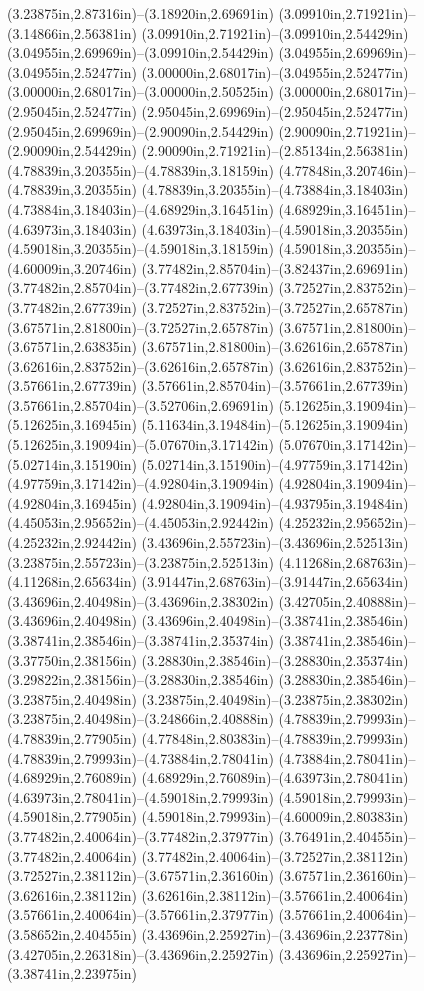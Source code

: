 (3.23875in,2.87316in)--(3.18920in,2.69691in) (3.09910in,2.71921in)--(3.14866in,2.56381in) (3.09910in,2.71921in)--(3.09910in,2.54429in) (3.04955in,2.69969in)--(3.09910in,2.54429in) (3.04955in,2.69969in)--(3.04955in,2.52477in) (3.00000in,2.68017in)--(3.04955in,2.52477in) (3.00000in,2.68017in)--(3.00000in,2.50525in) (3.00000in,2.68017in)--(2.95045in,2.52477in) (2.95045in,2.69969in)--(2.95045in,2.52477in) (2.95045in,2.69969in)--(2.90090in,2.54429in) (2.90090in,2.71921in)--(2.90090in,2.54429in) (2.90090in,2.71921in)--(2.85134in,2.56381in) (4.78839in,3.20355in)--(4.78839in,3.18159in) (4.77848in,3.20746in)--(4.78839in,3.20355in) (4.78839in,3.20355in)--(4.73884in,3.18403in) (4.73884in,3.18403in)--(4.68929in,3.16451in) (4.68929in,3.16451in)--(4.63973in,3.18403in) (4.63973in,3.18403in)--(4.59018in,3.20355in) (4.59018in,3.20355in)--(4.59018in,3.18159in) (4.59018in,3.20355in)--(4.60009in,3.20746in) (3.77482in,2.85704in)--(3.82437in,2.69691in) (3.77482in,2.85704in)--(3.77482in,2.67739in) (3.72527in,2.83752in)--(3.77482in,2.67739in) (3.72527in,2.83752in)--(3.72527in,2.65787in) (3.67571in,2.81800in)--(3.72527in,2.65787in) (3.67571in,2.81800in)--(3.67571in,2.63835in) (3.67571in,2.81800in)--(3.62616in,2.65787in) (3.62616in,2.83752in)--(3.62616in,2.65787in) (3.62616in,2.83752in)--(3.57661in,2.67739in) (3.57661in,2.85704in)--(3.57661in,2.67739in) (3.57661in,2.85704in)--(3.52706in,2.69691in) (5.12625in,3.19094in)--(5.12625in,3.16945in) (5.11634in,3.19484in)--(5.12625in,3.19094in) (5.12625in,3.19094in)--(5.07670in,3.17142in) (5.07670in,3.17142in)--(5.02714in,3.15190in) (5.02714in,3.15190in)--(4.97759in,3.17142in) (4.97759in,3.17142in)--(4.92804in,3.19094in) (4.92804in,3.19094in)--(4.92804in,3.16945in) (4.92804in,3.19094in)--(4.93795in,3.19484in) (4.45053in,2.95652in)--(4.45053in,2.92442in) (4.25232in,2.95652in)--(4.25232in,2.92442in) (3.43696in,2.55723in)--(3.43696in,2.52513in) (3.23875in,2.55723in)--(3.23875in,2.52513in) (4.11268in,2.68763in)--(4.11268in,2.65634in) (3.91447in,2.68763in)--(3.91447in,2.65634in) (3.43696in,2.40498in)--(3.43696in,2.38302in) (3.42705in,2.40888in)--(3.43696in,2.40498in) (3.43696in,2.40498in)--(3.38741in,2.38546in) (3.38741in,2.38546in)--(3.38741in,2.35374in) (3.38741in,2.38546in)--(3.37750in,2.38156in) (3.28830in,2.38546in)--(3.28830in,2.35374in) (3.29822in,2.38156in)--(3.28830in,2.38546in) (3.28830in,2.38546in)--(3.23875in,2.40498in) (3.23875in,2.40498in)--(3.23875in,2.38302in) (3.23875in,2.40498in)--(3.24866in,2.40888in) (4.78839in,2.79993in)--(4.78839in,2.77905in) (4.77848in,2.80383in)--(4.78839in,2.79993in) (4.78839in,2.79993in)--(4.73884in,2.78041in) (4.73884in,2.78041in)--(4.68929in,2.76089in) (4.68929in,2.76089in)--(4.63973in,2.78041in) (4.63973in,2.78041in)--(4.59018in,2.79993in) (4.59018in,2.79993in)--(4.59018in,2.77905in) (4.59018in,2.79993in)--(4.60009in,2.80383in) (3.77482in,2.40064in)--(3.77482in,2.37977in) (3.76491in,2.40455in)--(3.77482in,2.40064in) (3.77482in,2.40064in)--(3.72527in,2.38112in) (3.72527in,2.38112in)--(3.67571in,2.36160in) (3.67571in,2.36160in)--(3.62616in,2.38112in) (3.62616in,2.38112in)--(3.57661in,2.40064in) (3.57661in,2.40064in)--(3.57661in,2.37977in) (3.57661in,2.40064in)--(3.58652in,2.40455in) (3.43696in,2.25927in)--(3.43696in,2.23778in) (3.42705in,2.26318in)--(3.43696in,2.25927in) (3.43696in,2.25927in)--(3.38741in,2.23975in) 